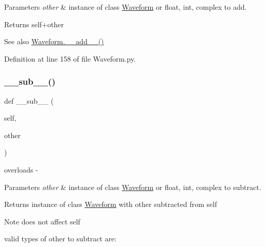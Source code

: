 \begin{DoxyParams}{Parameters}
{\em other} & instance of class \hyperlink{classSignalIntegrity_1_1TimeDomain_1_1Waveform_1_1Waveform_1_1Waveform}{Waveform} or float, int, complex to add. \\
\hline
\end{DoxyParams}
\begin{DoxyReturn}{Returns}
self+other 
\end{DoxyReturn}
\begin{DoxySeeAlso}{See also}
\hyperlink{classSignalIntegrity_1_1TimeDomain_1_1Waveform_1_1Waveform_1_1Waveform_a547cf97e438ebc6734fd6d1ea2b21b6d}{Waveform.\+\_\+\+\_\+add\+\_\+\+\_\+()} 
\end{DoxySeeAlso}


Definition at line 158 of file Waveform.\+py.

\mbox{\label{classSignalIntegrity_1_1TimeDomain_1_1Waveform_1_1Waveform_1_1Waveform_ae03b88268c88fb1edfdb3f5353478d7b}} 
\subsubsection{\texorpdfstring{\+\_\+\+\_\+sub\+\_\+\+\_\+()}{\_\_sub\_\_()}}
{\footnotesize\ttfamily def \+\_\+\+\_\+sub\+\_\+\+\_\+ (\begin{DoxyParamCaption}\item[{}]{self,  }\item[{}]{other }\end{DoxyParamCaption})}



overloads -\/ 


\begin{DoxyParams}{Parameters}
{\em other} & instance of class \hyperlink{classSignalIntegrity_1_1TimeDomain_1_1Waveform_1_1Waveform_1_1Waveform}{Waveform} or float, int, complex to subtract. \\
\hline
\end{DoxyParams}
\begin{DoxyReturn}{Returns}
instance of class \hyperlink{classSignalIntegrity_1_1TimeDomain_1_1Waveform_1_1Waveform_1_1Waveform}{Waveform} with other subtracted from self 
\end{DoxyReturn}
\begin{DoxyNote}{Note}
does not affect self 

valid types of other to subtract are\+:
\end{DoxyNote}


